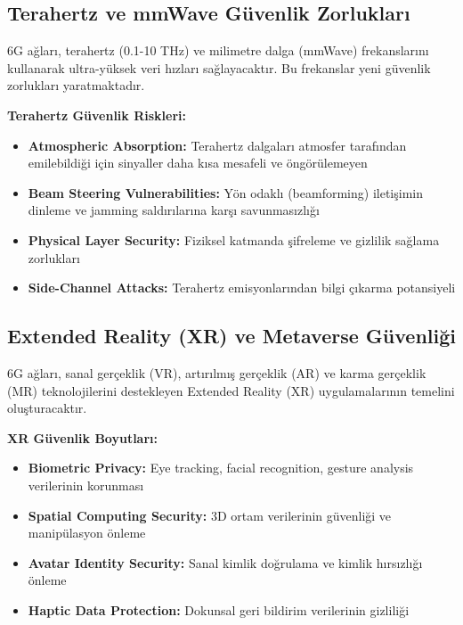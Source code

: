 \subsection{Terahertz ve mmWave Güvenlik Zorlukları}

6G ağları, terahertz (0.1-10 THz) ve milimetre dalga (mmWave) frekanslarını kullanarak ultra-yüksek veri hızları sağlayacaktır. Bu frekanslar yeni güvenlik zorlukları yaratmaktadır.

\textbf{Terahertz Güvenlik Riskleri:}
\begin{itemize}
    \item \textbf{Atmospheric Absorption:} Terahertz dalgaları atmosfer tarafından emilebildiği için sinyaller daha kısa mesafeli ve öngörülemeyen
    \item \textbf{Beam Steering Vulnerabilities:} Yön odaklı (beamforming) iletişimin dinleme ve jamming saldırılarına karşı savunmasızlığı
    \item \textbf{Physical Layer Security:} Fiziksel katmanda şifreleme ve gizlilik sağlama zorlukları
    \item \textbf{Side-Channel Attacks:} Terahertz emisyonlarından bilgi çıkarma potansiyeli
\end{itemize}

\subsection{Extended Reality (XR) ve Metaverse Güvenliği}

6G ağları, sanal gerçeklik (VR), artırılmış gerçeklik (AR) ve karma gerçeklik (MR) teknolojilerini destekleyen Extended Reality (XR) uygulamalarının temelini oluşturacaktır.

\textbf{XR Güvenlik Boyutları:}
\begin{itemize}
    \item \textbf{Biometric Privacy:} Eye tracking, facial recognition, gesture analysis verilerinin korunması
    \item \textbf{Spatial Computing Security:} 3D ortam verilerinin güvenliği ve manipülasyon önleme
    \item \textbf{Avatar Identity Security:} Sanal kimlik doğrulama ve kimlik hırsızlığı önleme
    \item \textbf{Haptic Data Protection:} Dokunsal geri bildirim verilerinin gizliliği
\end{itemize}

